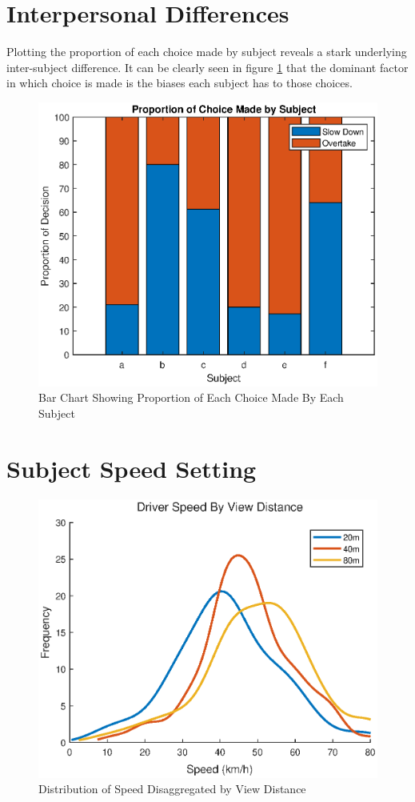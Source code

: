 \section{Interpersonal Differences}
Plotting the proportion of each choice made by subject reveals a stark underlying inter-subject difference. It can be clearly seen in figure \ref{fig:Underlying_biases} that the dominant factor in which choice is made is the biases each subject has to those choices.
\begin{figure}[H]
    \centering
    \includegraphics[width=0.75\linewidth]{figures/Proportions_by_sub.eps}
    \caption{Bar Chart Showing Proportion of Each Choice Made By Each Subject}
    \label{fig:Underlying_biases}
\end{figure}

\section{Subject Speed Setting}
\begin{figure}[H]
    \centering
    \includegraphics[width=0.75\linewidth]{figures/Speed_Setting_By_View_Dist.eps}
    \caption{Distribution of Speed Disaggregated by View Distance}
    \label{fig:Speed_Setting}
\end{figure}

